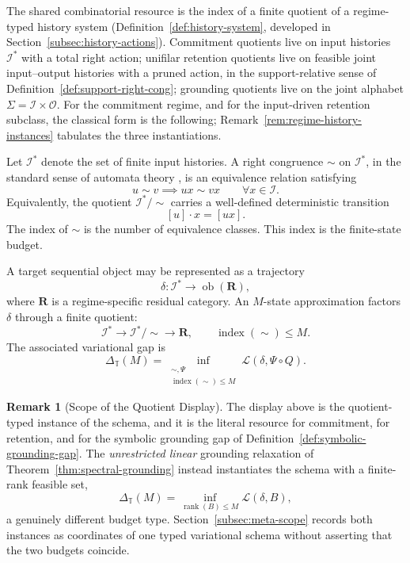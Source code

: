 \documentclass[12pt]{article}
\theoremstyle{definition}
\newtheorem{remark}[theorem]{Remark}
\begin{document}
The shared combinatorial resource is the index of a finite quotient of a
regime-typed history system (Definition~\ref{def:history-system}, developed in
Section~\ref{subsec:history-actions}).
Commitment quotients live on input histories $\mathcal I^*$ with a total right
action; unifilar retention quotients live on feasible joint input--output
histories with a pruned action, in the support-relative sense of
Definition~\ref{def:support-right-cong}; grounding quotients live on the joint
alphabet $\Sigma=\mathcal I\times\mathcal O$.  For the commitment regime, and
for the input-driven retention subclass, the classical form is the following;
Remark~\ref{rem:regime-history-instances} tabulates the three instantiations.

Let $\mathcal I^*$ denote the set of finite input histories.  A right
congruence $\sim$ on $\mathcal I^*$, in the standard sense of automata theory
\cite{sakarovitch2009}, is an equivalence relation satisfying
\[
u\sim v
\implies
ux\sim vx
\qquad
\forall x\in\mathcal I.
\]
Equivalently, the quotient $\mathcal I^*/\!\sim$ carries a well-defined
deterministic transition
\[
[u]\cdot x=[ux].
\]
The index of $\sim$ is the number of equivalence classes.  This index is the
finite-state budget.

A target sequential object may be represented as a trajectory
\[
\delta:\mathcal I^*\to\operatorname{ob}(\mathbf R),
\]
where $\mathbf R$ is a regime-specific residual category.  An $M$-state
approximation factors $\delta$ through a finite quotient:
\[
\mathcal I^*
\longrightarrow
\mathcal I^*/\!\sim
\longrightarrow
\mathbf R,
\qquad
\operatorname{index}(\sim)\le M.
\]
The associated variational gap is
\[
\Delta_{\mathbb T}(M)
=
\inf_{\substack{\sim,\Psi\\ \operatorname{index}(\sim)\le M}}
\mathcal L(\delta,\Psi\circ Q).
\]

\begin{remark}[Scope of the Quotient Display]
\label{rem:quotient-display-scope}
The display above is the quotient-typed instance of the schema, and it is the
literal resource for commitment, for retention, and for the symbolic
grounding gap of Definition~\ref{def:symbolic-grounding-gap}.  The
\emph{unrestricted linear} grounding relaxation of
Theorem~\ref{thm:spectral-grounding} instead instantiates the schema with a
finite-rank feasible set,
\[
\Delta_{\mathbb T}(M)
=
\inf_{\operatorname{rank}(B)\le M}
\mathcal L(\delta,B),
\]
a genuinely different budget type.  Section~\ref{subsec:meta-scope} records
both instances as coordinates of one typed variational schema without
asserting that the two budgets coincide.
\end{remark}
\end{document}
